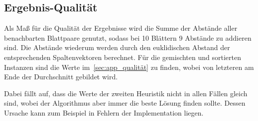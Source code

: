 \documentclass[a4paper, 10pt, twoside, onecolumn, parskip]{scrartcl}
\begin{document}
    \subsection{Ergebnis-Qualität} \label{sec:qualität}

    Als Maß für die Qualität der Ergebnisse wird die Summe der Abstände aller benachbarten Blattpaare genutzt, sodass bei 10 Blättern 9 Abstände zu addieren sind.
    Die Abstände wiederum werden durch den euklidischen Abstand der entsprechenden Spaltenvektoren berechnet.
    Für die gemischten und sortierten Instanzen sind die Werte im~\autoref{sec:app_qualität} zu finden, wobei von letzteren am Ende der Durchschnitt gebildet wird.

    Dabei fällt auf, dass die Werte der zweiten Heuristik nicht in allen Fällen gleich sind, wobei der Algorithmus aber immer die beste Lösung finden sollte.
    Dessen Ursache kann zum Beispiel in Fehlern der Implementation liegen.



\end{document}
